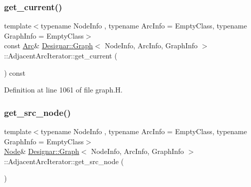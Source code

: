\subsubsection{\texorpdfstring{get\+\_\+current()}{get\_current()}\hspace{0.1cm}{\footnotesize\ttfamily [2/2]}}
{\footnotesize\ttfamily template$<$typename Node\+Info , typename Arc\+Info  = Empty\+Class, typename Graph\+Info  = Empty\+Class$>$ \\
const \hyperlink{class_designar_1_1_graph_a74c730ef4ce2d20f998d72bd25c2b5bf}{Arc}\& \hyperlink{class_designar_1_1_graph}{Designar\+::\+Graph}$<$ Node\+Info, Arc\+Info, Graph\+Info $>$\+::Adjacent\+Arc\+Iterator\+::get\+\_\+current (\begin{DoxyParamCaption}{ }\end{DoxyParamCaption}) const\hspace{0.3cm}{\ttfamily [inline]}}



Definition at line 1061 of file graph.\+H.

\mbox{\label{class_designar_1_1_graph_1_1_adjacent_arc_iterator_a0a5f3238f6abde756b4498a31558a255}} 
\subsubsection{\texorpdfstring{get\+\_\+src\+\_\+node()}{get\_src\_node()}\hspace{0.1cm}{\footnotesize\ttfamily [1/2]}}
{\footnotesize\ttfamily template$<$typename Node\+Info , typename Arc\+Info  = Empty\+Class, typename Graph\+Info  = Empty\+Class$>$ \\
\hyperlink{class_designar_1_1_graph_a5dfc7dba9d092ac489c72e40390c37d0}{Node}\& \hyperlink{class_designar_1_1_graph}{Designar\+::\+Graph}$<$ Node\+Info, Arc\+Info, Graph\+Info $>$\+::Adjacent\+Arc\+Iterator\+::get\+\_\+src\+\_\+node (\begin{DoxyParamCaption}{ }\end{DoxyParamCaption})\hspace{0.3cm}{\ttfamily [inline]}}



